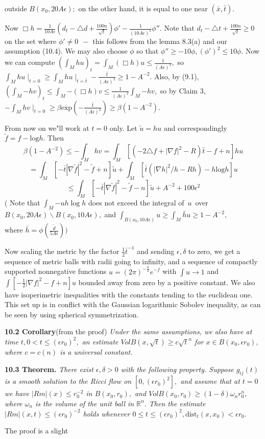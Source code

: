 \documentclass[12pt]{article}
\newcommand{\e}{\epsilon}
\newcommand{\de}{\delta}
\newcommand{\be}{\beta}
\newcommand{\bx}{\bar{x}}
\newcommand{\bt}{\bar{t}}
\theoremstyle{plain}
{\swapnumbers
\newtheorem{thm}{Theorem}[section]
\newtheorem{cor}[thm]{Corollary}
\newtheorem{lem}[thm]{Lemma}
\newtheorem{prop}[thm]{Proposition}
}
\theoremstyle{definition}
{\swapnumbers
\newtheorem{defn}[thm]{Definition}
\newtheorem{nota}[thm]{Notation}
\newtheorem{parag}[thm]{}
\newtheorem*{parstr}{\addtocounter{thm}{1}\thesection.\arabic{thm}*}
\newtheorem*{intropar}{\addtocounter{thm}{1}\arabic{thm}}
}
\theoremstyle{remark} {\swapnumbers
\newtheorem{rem}[thm]{Remark}
\newtheorem{exam}[thm]{Example}
\newtheorem{lemma}[thm]{Lemma}
\newtheorem{claim}[thm]{Claim}
}
\numberwithin{equation}{section}
\begin{document}
 outside $B(x_0,20A\e);$ on the other hand, it is equal to one
 near $(\bx,\bt).$ \par Now $\Box h=\frac{1}{10A\e}(d_t-\triangle
 d+\frac{100n}{\sqrt{t}})\phi '-\frac{1}{(10A\e)^2}\phi ''.$ Note
 that $d_t-\triangle t+\frac{100n}{\sqrt{t}}\ge 0$ on the set
 where $\phi '\neq 0 \ \ -$ this follows from the lemma  8.3(a) and
 our assumption (10.4). We may also choose $\phi$ so that $\phi
 ''\ge -10\phi, (\phi ')^2\le 10\phi.$ Now we can compute
 $(\int_M{hu})_t=\int_M{(\Box h)u}\le \frac{1}{(A\e)^2},$ so
 $\int_M{hu}\mid_{t=0}\ge
 \int_M{hu}\mid_{t=\bt}-\frac{\bt}{(A\e)^2}\ge 1-A^{-2}.$ Also, by
 (9.1), $(\int_M{-hv})_t\le \int_M{-(\Box h)v}\le
 \frac{1}{(A\e)^2}\int_M{-hv},$ so by Claim 3, $
 -\int_M{hv}\mid_{t=0}\ge \be \mbox{exp}(-\frac{\bt}{(A\e)^2})\ge
 \be (1-A^{-2}).$ \par From now on we"ll work at $t=0$ only. Let
 $\tilde{u}=hu$ and correspondingly $\tilde{f}=f-\mbox{log}h.$
 Then $$ \be (1-A^{-2})\le -\int_M{hv}=\int_M{[(-2\triangle
 f+|\nabla f|^2-R)\bt -f+n]hu}$$ $$=\int_M{[-\bt |\nabla
 \tilde{f}|^2-\tilde{f}+n]\tilde{u}}+ \int_M{[\bt(|\nabla
 h|^2/h-Rh)-h\mbox{log}h]u}$$
 $$\le\int_M{[-\bt|\nabla\tilde{f}|^2-\tilde{f}-n]\tilde{u}}+A^{-2}+100\e^2$$
 ( Note  that  $\int_M{-uh \log h}$ does   not exceed  the  integral
 of\  $u$\  over \\ $B(x_0,20A\e)\backslash B(x_0,10A\e),$ and
 $\int_{B(x_0,10A\e)}{u}\ge \int_M{\bar{h}u}\ge 1-A^{-2},$\\ where
 $\bar{h}=\phi(\frac{\tilde{d}}{5A\e}))$ \par Now scaling the metric by
 the factor $\frac{1}{2}\bt^{-1}$ and sending $\e,\de$ to zero, we
 get a sequence of metric balls with radii going to infinity, and
 a sequence of compactly supported nonnegative functions
 $u=(2\pi)^{-\frac{n}{2}}e^{-f}$ with $\int{u}\to 1$ and
 $\int{[-\frac{1}{2}|\nabla f|^2-f+n]u}$ bounded away from zero by
 a positive constant. We also have isoperimetric inequalities with
 the constants tending to the euclidean one. This set up is in
 conflict with the Gaussian logarithmic Sobolev inequality, as can
 be seen by using spherical symmetrization. \par {\bf 10.2 Corollary}(from
 the proof) {\it Under the same assumptions, we also have at time $t,
 0<t\le (\e r_0)^2,$ an estimate $Vol B(x,\sqrt{t})\ge c\sqrt{t}^n
 $ for $x\in B(x_0,\e r_0),$ where $c=c(n)$ is a universal
 constant.} \par {\bf 10.3 Theorem.} {\it There exist $\e,\de > 0$ with the following
 property. Suppose $g_{ij}(t)$ is a smooth solution to the Ricci
 flow on $[0,(\e r_0)^2],$ and assume that at $t=0$ we have
 $|Rm|(x)\le r_0^{-2}$ in $B(x_0,r_0),$ and $VolB(x_0,r_0)\ge
 (1-\de)\omega_n r_0^n,$ where $\omega_n$ is the volume of the
 unit ball in $\mathbb{R}^n.$ Then the estimate $|Rm|(x,t)\le (\e
 r_0)^{-2}$ holds whenever $0\le t\le (\e r_0)^2,
 \mbox{dist}_t(x,x_0)<\e r_0.$}\par The proof is a slight
\end{document}

